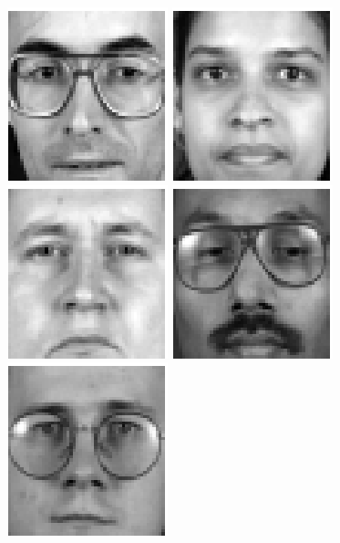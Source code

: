 \begin{figure}[ht]
\begin{center}
\includegraphics[scale=0.12]{ch4/figures/XM2VTS_21.png}
\includegraphics[scale=0.12]{ch4/figures/XM2VTS_22.png}
\includegraphics[scale=0.12]{ch4/figures/XM2VTS_23.png}
\includegraphics[scale=0.12]{ch4/figures/XM2VTS_24.png}\\
\includegraphics[scale=0.12]{ch4/figures/XM2VTS_25.png}

\end{center}
\end{figure}

